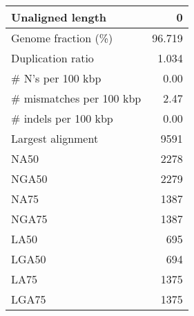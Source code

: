 \documentclass[12pt,a4paper]{article}
\begin{document}
\begin{table}[ht]
\begin{center}
\begin{tabular}{|l*{1}{|r}|}
Unaligned length & 0 \\ \hline
Genome fraction (\%) & 96.719 \\ \hline
Duplication ratio & 1.034 \\ \hline
\# N's per 100 kbp & 0.00 \\ \hline
\# mismatches per 100 kbp & 2.47 \\ \hline
\# indels per 100 kbp & 0.00 \\ \hline
Largest alignment & 9591 \\ \hline
NA50 & 2278 \\ \hline
NGA50 & 2279 \\ \hline
NA75 & 1387 \\ \hline
NGA75 & 1387 \\ \hline
LA50 & 695 \\ \hline
LGA50 & 694 \\ \hline
LA75 & 1375 \\ \hline
LGA75 & 1375 \\ \hline
\end{tabular}
\end{center}
\end{table}
\end{document}
